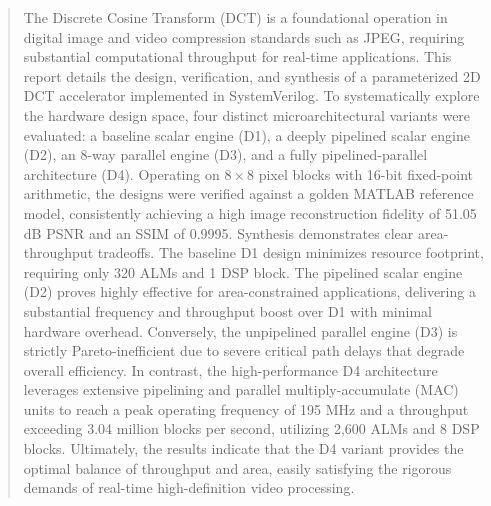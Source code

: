 \begin{abstract}
The Discrete Cosine Transform (DCT) is a foundational operation in digital image and video compression standards such as JPEG, requiring substantial computational throughput for real-time applications. This report details the design, verification, and synthesis of a parameterized 2D DCT accelerator implemented in SystemVerilog. To systematically explore the hardware design space, four distinct microarchitectural variants were evaluated: a baseline scalar engine (D1), a deeply pipelined scalar engine (D2), an 8-way parallel engine (D3), and a fully pipelined-parallel architecture (D4). Operating on $8 \times 8$ pixel blocks with 16-bit fixed-point arithmetic, the designs were verified against a golden MATLAB reference model, consistently achieving a high image reconstruction fidelity of 51.05 dB PSNR and an SSIM of 0.9995. Synthesis demonstrates clear area-throughput tradeoffs. The baseline D1 design minimizes resource footprint, requiring only 320 ALMs and 1 DSP block. The pipelined scalar engine (D2) proves highly effective for area-constrained applications, delivering a substantial frequency and throughput boost over D1 with minimal hardware overhead. Conversely, the unpipelined parallel engine (D3) is strictly Pareto-inefficient due to severe critical path delays that degrade overall efficiency. In contrast, the high-performance D4 architecture leverages extensive pipelining and parallel multiply-accumulate (MAC) units to reach a peak operating frequency of 195 MHz and a throughput exceeding 3.04 million blocks per second, utilizing 2,600 ALMs and 8 DSP blocks. Ultimately, the results indicate that the D4 variant provides the optimal balance of throughput and area, easily satisfying the rigorous demands of real-time high-definition video processing.
\end{abstract}
